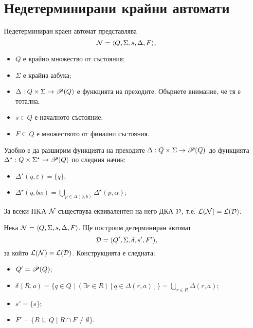 \section{Недетерминирани крайни автомати}
\begin{dfn}
  Недетерминиран краен автомат представлява
  \[\mathcal{N} = \langle{Q,\Sigma,s,\Delta,F}\rangle,\]
  \begin{itemize}
  \item
    $Q$ е крайно множество от състояния;
  \item
    $\Sigma$ е крайна азбука;
  \item
    $\Delta: Q\times\Sigma \to \mathscr{P}(Q)$ е функцията на преходите.
    Обърнете внимание, че тя е тотална.
  \item
    $s \in Q$ е началното състояние;
  \item
    $F\subseteq Q$ е множеството от финални състояния.
  \end{itemize}
\end{dfn}

Удобно е да разширим функцията на преходите $\Delta: Q\times\Sigma \to \mathscr{P}(Q)$ 
до функцията $\Delta^\star: Q\times\Sigma^\star \to \mathscr{P}(Q)$ по следния начин:
\begin{itemize}
\item 
  $\Delta^\star(q, \varepsilon) = \{q\}$;
\item
  $\Delta^\star(q, b\alpha) = \bigcup_{p \in \Delta(q,b)} \Delta^\star(p, \alpha)$;
\end{itemize}

\begin{framed}
\begin{thm}
  За всеки НKА $\mathcal{N}$ съществува еквивалентен на него ДКА $\mathcal{D}$, т.е. $\mathcal{L}(\mathcal{N}) = \mathcal{L}(\mathcal{D})$.
\end{thm}
\end{framed}
\begin{hint}
  Нека $\mathcal{N} = \langle{Q,\Sigma,s,\Delta,F}\rangle$. Ще построим детерминиран автомат
  \[\mathcal{D} = (Q',\Sigma,\delta,s',F'),\]
  за който $\mathcal{L}(\mathcal{N}) = \mathcal{L}(\mathcal{D})$.
  Конструкцията е следната:
  \begin{itemize}
  \item
    $Q' = \mathscr{P}(Q)$;
  \item
    $\delta(R,a) = \{q\in Q\mid (\exists r\in R)[q\in\Delta(r,a)]\} = \bigcup_{r\in R}\Delta(r,a)$;
  \item
    $s' = \{s\}$;
  \item
    $F' = \{R \subseteq Q \mid R\cap F \neq \emptyset\}$.
  \end{itemize}
\end{hint}

